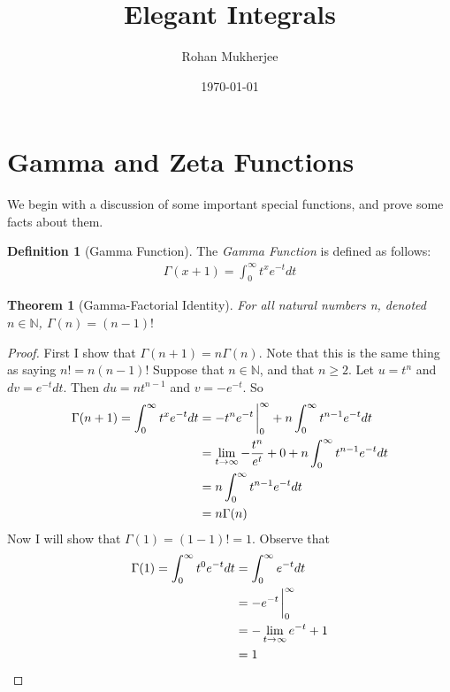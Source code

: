 \documentclass[12pt]{article}
\title{Elegant Integrals}
\date{\today}
\author{Rohan Mukherjee}
\def\mbb#1{\mathbb{#1}}
\def\bN{\mbb{N}}
\newtheorem{theorem}{Theorem}[section]
\theoremstyle{definition}
\newtheorem{definition}{Definition}[section]
\theoremstyle{remark}
\newcommand{\indef}{\int_{0}^{\infty}}
\begin{document}
    \maketitle

    \section{Gamma and Zeta Functions}
    We begin with a discussion of some important special functions, and prove some facts about them.
    \begin{definition}[Gamma Function]\label{Gamma}
        The \textit{Gamma Function} is defined as follows:
        \begin{align*}
            \Gamma(x+1) = \indef t^xe^{-t}dt
        \end{align*}    
    \end{definition}

    \begin{theorem}[Gamma-Factorial Identity]
        For all natural numbers n, denoted $n \in \bN$, $\Gamma(n) = (n-1)!$
    \end{theorem}

    \begin{proof}
        First I show that $\Gamma(n+1)=n\Gamma(n)$. 
        Note that this is the same thing as saying $n! = n(n-1)!$
        Suppose that $n \in \bN$, and that $n \geq 2$. 
        Let $u = t^n$ and $dv = e^{-t}dt$. Then $du = nt^{n-1}$ and $v = -e^{-t}$. So 
        \begin{align*}
            \Gamma(n+1) = \indef t^xe^{-t}dt &= -t^ne^{-t}\eval_{0}^{\infty} + n\indef t^{n-1}e^{-t}dt \\ 
            &= \lim_{t \to \infty} -\frac{t^n}{e^{t}} + 0 + n\indef t^{n-1}e^{-t}dt \\ 
            &= n\indef t^{n-1}e^{-t}dt \\ 
            &= n\Gamma(n)
        \end{align*}
        Now I will show that $\Gamma(1) = (1-1)! = 1$. Observe that
        \begin{align*}
           \Gamma(1) = \indef t^{0}e^{-t}dt &= \indef e^{-t}dt \\ 
           &= -e^{-t} \eval_{0}^{\infty} \\ 
           &= -\lim_{t \to \infty} e^{-t} + 1 \\ 
           &= 1
        \end{align*}
    \end{proof}
\end{document}
